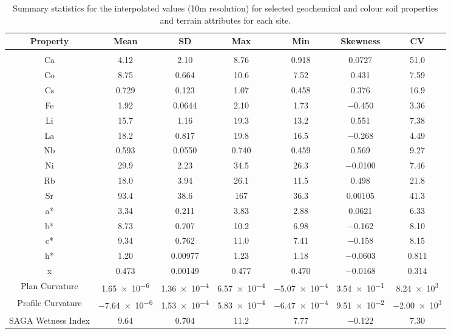 \documentclass[
  number]{elsarticle}
\begin{document}
\begin{longtable}[]{@{}ccccccc@{}}

\caption{\label{tbl-univariate2-summary}Summary statistics for the
interpolated values (10m resolution) for selected geochemical and colour
soil properties and terrain attributes for each site.}

\tabularnewline

\toprule\noalign{}
Property & Mean & SD & Max & Min & Skewness & CV \\
\midrule\noalign{}
\endhead
\bottomrule\noalign{}
\endlastfoot
\multicolumn{7}{@{}c@{}}{%
Agriculture} \\
Ca & 4.12 & 2.10 & 8.76 & 0.918 & 0.0727 & 51.0 \\
Co & 8.75 & 0.664 & 10.6 & 7.52 & 0.431 & 7.59 \\
Cs & 0.729 & 0.123 & 1.07 & 0.458 & 0.376 & 16.9 \\
Fe & 1.92 & 0.0644 & 2.10 & 1.73 & −0.450 & 3.36 \\
Li & 15.7 & 1.16 & 19.3 & 13.2 & 0.551 & 7.38 \\
La & 18.2 & 0.817 & 19.8 & 16.5 & −0.268 & 4.49 \\
Nb & 0.593 & 0.0550 & 0.740 & 0.459 & 0.569 & 9.27 \\
Ni & 29.9 & 2.23 & 34.5 & 26.3 & −0.0100 & 7.46 \\
Rb & 18.0 & 3.94 & 26.1 & 11.5 & 0.498 & 21.8 \\
Sr & 93.4 & 38.6 & 167 & 36.3 & 0.00105 & 41.3 \\
a* & 3.34 & 0.211 & 3.83 & 2.88 & 0.0621 & 6.33 \\
b* & 8.73 & 0.707 & 10.2 & 6.98 & −0.162 & 8.10 \\
c* & 9.34 & 0.762 & 11.0 & 7.41 & −0.158 & 8.15 \\
h* & 1.20 & 0.00977 & 1.23 & 1.18 & −0.0603 & 0.811 \\
x & 0.473 & 0.00149 & 0.477 & 0.470 & −0.0168 & 0.314 \\
Plan Curvature & 1.65~×~10\textsuperscript{−6} &
1.36~×~10\textsuperscript{−4} & 6.57~×~10\textsuperscript{−4} &
−5.07~×~10\textsuperscript{−4} & 3.54~×~10\textsuperscript{−1} &
8.24~×~10\textsuperscript{3} \\
Profile Curvature & −7.64~×~10\textsuperscript{−6} &
1.53~×~10\textsuperscript{−4} & 5.83~×~10\textsuperscript{−4} &
−6.47~×~10\textsuperscript{−4} & 9.51~×~10\textsuperscript{−2} &
−2.00~×~10\textsuperscript{3} \\
SAGA Wetness Index & 9.64 & 0.704 & 11.2 & 7.77 & −0.122 & 7.30 \\

\end{longtable}
\end{document}
